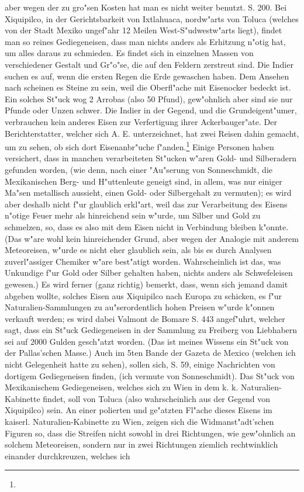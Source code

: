 \documentclass[a4paper, 11pt, oneside, polutonikogreek, german]{article}
\begin{document}
aber wegen der zu gro"sen Kosten hat man es nicht weiter benutzt. S. 200. Bei Xiquipilco, in der Gerichtsbarkeit von Ixtlahuaca, nordw"arts von Toluca (welches von der Stadt Mexiko ungef"ahr 12 Meilen West-S"udwestw"arts liegt), findet man so reines Gediegeneisen, dass man nichts anders als Erhitzung n"otig hat, um alles daraus zu schmieden. Es findet sich in einzelnen Massen von verschiedener Gestalt und Gr"o"se, die auf den Feldern zerstreut sind. Die Indier suchen es auf, wenn die ersten Regen die Erde gewaschen haben. Dem Ansehen nach scheinen es Steine zu sein, weil die Oberfl"ache mit Eisenocker bedeckt ist. Ein solches St"uck wog 2 Arrobas (also 50 Pfund), gew"ohnlich aber sind sie nur Pfunde oder Unzen schwer. Die Indier in der Gegend, und die Grundeigent"umer, verbrauchen kein anderes Eisen zur Verfertigung ihrer Ackerbauger"ate. Der Berichterstatter, welcher sich A. E. unterzeichnet, hat zwei Reisen dahin gemacht, um zu sehen, ob sich dort Eisenanbr"uche f"anden.\footnote{} Einige Personen haben versichert, dass in manchen verarbeiteten St"ucken w"aren Gold- und Silberadern gefunden worden, (wie denn, nach einer "Au"serung von Sonneschmidt, die Mexikanischen Berg- und H"uttenleute geneigt sind, in allem, was nur einiger Ma"sen metallisch aussieht, einen Gold- oder Silbergehalt zu vermuten); es wird aber deshalb nicht f"ur glaublich erkl"art, weil das zur Verarbeitung des Eisens n"otige Feuer mehr als hinreichend sein w"urde, um Silber und Gold zu schmelzen, so, dass es also mit dem Eisen nicht in Verbindung bleiben k"onnte. (Das w"are wohl kein hinreichender Grund, aber wegen der Analogie mit anderem Meteoreisen, w"urde es nicht eher glaublich sein, als bis es durch Analysen zuverl"assiger Chemiker w"are best"atigt worden. Wahrscheinlich ist das, was Unkundige f"ur Gold oder Silber gehalten haben, nichts anders als Schwefeleisen gewesen.) Es wird ferner (ganz richtig) bemerkt, dass, wenn sich jemand damit abgeben wollte, solches Eisen aus Xiquipilco nach Europa zu schicken, es f"ur Naturalien-Sammlungen zu au"serordentlich hohen Preisen w"urde k"onnen verkauft werden; es wird dabei Valmont de Bomare S. 443 angef"uhrt, welcher sagt, dass ein St"uck Gediegeneisen in der Sammlung zu Freiberg von Liebhabern sei auf 2000 Gulden gesch"atzt worden. (Das ist meines Wissens ein St"uck von der Pallas'schen Masse.) Auch im 5ten Bande der Gazeta de Mexico (welchen ich nicht Gelegenheit hatte zu sehen), sollen sich, S. 59, einige Nachrichten von dortigem Gediegeneisen finden, (ich vermute von Sonneschmidt). Das St"uck von Mexikanischem Gediegeneisen, welches sich zu Wien in dem k. k. Naturalien-Kabinette findet, soll von Toluca (also wahrscheinlich aus der Gegend von Xiquipilco) sein. An einer polierten und ge"atzten Fl"ache dieses Eisens im kaiserl. Naturalien-Kabinette zu Wien, zeigen sich die Widmanst"adt'schen Figuren so, dass die Streifen nicht sowohl in drei Richtungen, wie gew"ohnlich an solchem Meteoreisen, sondern nur in zwei Richtungen ziemlich rechtwinklich einander durchkreuzen, welches ich 
\end{document}
